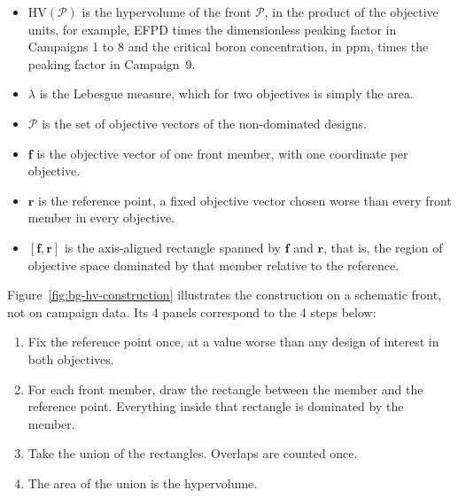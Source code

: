 \begin{itemize}
  \item $\mathrm{HV}(\mathcal{P})$ is the hypervolume of the front
        $\mathcal{P}$, in the product of the objective units, for
        example, EFPD times the dimensionless peaking factor in
        Campaigns 1 to 8 and the critical boron concentration, in ppm,
        times the peaking factor in Campaign~9.

  \item $\lambda$ is the Lebesgue measure, which for two objectives is
        simply the area.

  \item $\mathcal{P}$ is the set of objective vectors of the
        non-dominated designs.

  \item $\mathbf{f}$ is the objective vector of one front member, with
        one coordinate per objective.

  \item $\mathbf{r}$ is the reference point, a fixed objective vector
        chosen worse than every front member in every objective.

  \item $[\mathbf{f}, \mathbf{r}]$ is the axis-aligned rectangle
        spanned by $\mathbf{f}$ and $\mathbf{r}$, that is, the region
        of objective space dominated by that member relative to the
        reference.
\end{itemize}

Figure~\ref{fig:bg-hv-construction} illustrates the construction on a
schematic front, not on campaign data. Its 4 panels correspond to
the 4 steps below:

\begin{enumerate}
  \item Fix the reference point once, at a value worse than any design
        of interest in both objectives.

  \item For each front member, draw the rectangle between the member
        and the reference point. Everything inside that rectangle is
        dominated by the member.

  \item Take the union of the rectangles. Overlaps are counted once.

  \item The area of the union is the hypervolume.
\end{enumerate}

